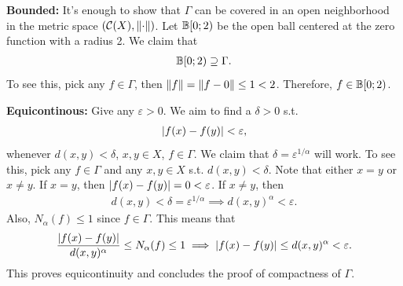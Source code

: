 \documentclass[12pt]{article}
\begin{document}
\begin{fproof}[1(a)]


\textbf{Bounded:}
It's enough to show that \(\Gamma\) can be covered in an open neighborhood in the metric space \((\mathcal{C}(X), \left\lVert \cdot \right\rVert)\).
Let \(\mathbb{B}[0; 2)\) be the open ball centered at the zero function with a radius 2.
We claim that 
\begin{align*}
    \mathbb{B}[0; 2) \supseteq \Gamma.
\end{align*}
To see this, pick any \(f \in \Gamma\), then \(\left\lVert f \right\rVert = \left\lVert f - 0 \right\rVert \leq 1 < 2\).
Therefore, \(f \in \mathbb{B}[0; 2)\).

\textbf{Equicontinous:}
Give any \(\varepsilon > 0\).
We aim to find a \(\delta > 0\) s.t.
\begin{align*}
    \left\lvert f(x)-f(y) \right\rvert < \varepsilon,
\end{align*}
whenever \(d(x,y) < \delta\), \(x,y \in X\), \(f \in \Gamma\).
We claim that \(\delta = \varepsilon^{1/\alpha}\) will work.
To see this, pick any \(f \in \Gamma\) and any \(x,y \in X\) s.t. \(d(x,y) < \delta\).
Note that either \(x=y\) or \(x\neq y\).
If \(x=y\), then \(\left\lvert f(x)-f(y) \right\rvert = 0 < \varepsilon\).
If \(x \neq y\), then
\begin{align*}
    d(x,y) < \delta = \varepsilon^{1/\alpha} \implies d(x,y)^{\alpha} < \varepsilon.
\end{align*}
Also, \(N_{\alpha}(f) \leq 1\) since \(f \in \Gamma\).
This means that
\begin{align*}
    \frac{\left\lvert f(x)-f(y) \right\rvert}{d(x,y)^{\alpha}} \leq N_{\alpha}(f) \leq 1 \implies \left\lvert f(x)-f(y) \right\rvert \leq d(x,y)^{\alpha} < \varepsilon.
\end{align*}
This proves equicontinuity and concludes the proof of compactness of \(\Gamma\).
\end{fproof}
\end{document}
